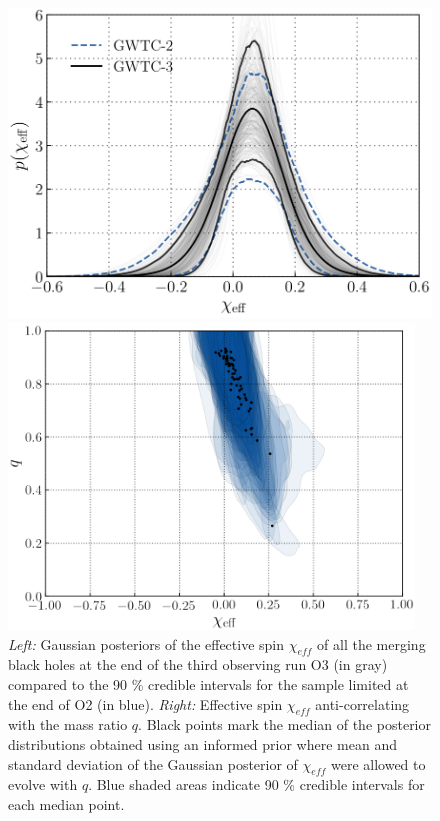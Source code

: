 \documentclass[a4paper,titlepage]{book}     	%
\begin{document}
\begin{figure}
	\begin{minipage}{.49\textwidth}
		\centering
		\includegraphics[width=\textwidth]{./images/spineff.png}
	\end{minipage}
	\hfill
	\begin{minipage}{.49\textwidth}
		\vspace{-1mm}
		\centering
		\includegraphics[width=0.96\textwidth]{./images/spinmassratio.png}	
	\end{minipage}
	\caption{\emph{Left:} Gaussian posteriors of the effective spin $\chi_{eff}$ of all the merging black holes at the end of the third observing run O3 (in gray) compared to the 90 \% credible intervals for the sample limited at the end of O2 (in blue). \emph{Right:} Effective spin $\chi_{eff}$ anti-correlating with the mass ratio $q$. Black points mark the median of the posterior distributions obtained using an informed prior where mean and standard deviation of the Gaussian posterior of $\chi_{eff}$ were allowed to evolve with $q$. Blue shaded areas indicate 90 \% credible intervals for each median point. \cite{GWTC-3_interpretation}} \label{fig:spineffective}
\end{figure}
\end{document}
